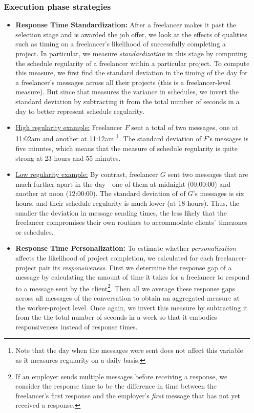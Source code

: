 \subsubsection{Execution phase strategies}

\begin{itemize}
\setlength\itemsep{1em}
    \item \textbf{Response Time Standardization: }After a freelancer makes it past the selection stage and is awarded the job offer, we look at the effects of qualities such as timing on a freelancer's likelihood of successfully completing a project. In particular, we measure \textit{standardization} in this stage by computing  the schedule regularity of a freelancer within a particular project. 
    {To compute this measure, we first find the standard deviation in the timing of the day for a freelancer's messages across all their projects (this is a freelancer-level measure). But since that measures the variance in schedules, we invert the standard deviation by subtracting it from the total number of seconds in a day to better represent schedule regularity. }
    
    \item[\ding{46}]{\underline{High regularity example:} Freelancer $F$ sent a total of two messages, one at 11:02am and another at 11:12am \footnote{{Note that the day when the messages were sent does not affect this variable as it measures regularity on a daily basis.}}. The standard deviation of $F$'s messages is five minutes, which means that the measure of schedule regularity is quite strong at 23 hours and 55 minutes.} 
    
    \item[\ding{46}] {\underline{Low regularity example:} By contrast, freelancer $G$ sent two messages that are much further apart in the day - one of them at midnight (00:00:00) and another at noon (12:00:00). The standard deviation of of $G$'s messages is six hours, and their schedule regularity is much lower (at 18 hours).} Thus, the smaller the deviation in message sending times, {the less likely that the freelancer compromises their own routines to accommodate clients' timezones or schedules. }

    \item\textbf{Response Time Personalization:} To estimate whether \textit{personalization} affects the likelihood of project completion, we calculated for each freelancer-project pair its \textit{responsiveness}. 
    {First we determine the response gap of a message by calculating the amount of time it takes for a freelancer to respond to a message sent by the client}\footnote{ If an employer sends multiple messages before receiving a response, we consider the response time to be the difference in time between the freelancer's first response and the employer's \textit{first} message that has not yet received a response.}. 
    {Then all we average these response gaps across all messages of the conversation to obtain an aggregated measure at the worker-project level. Once again, we invert this measure by subtracting it from the the total number of seconds in a week so that it embodies responsiveness instead of response times.}
    

\end{itemize}
